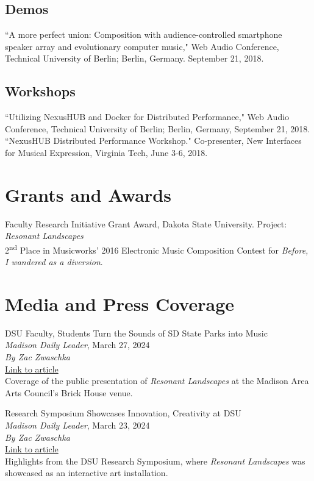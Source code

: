 \documentclass[12pt, a4paper]{article}
\newcommand{\years}[1]{\marginnote{\scriptsize #1}}
\begin{document}
\subsection*{Demos}
\years{2019} ``A more perfect union: Composition with audience-controlled smartphone speaker array and evolutionary computer music," Web Audio Conference, Technical University of Berlin; Berlin, Germany. September 21, 2018.

\subsection*{Workshops}
\years{2018} ``Utilizing NexusHUB and Docker for Distributed Performance," Web Audio Conference, Technical University of Berlin; Berlin, Germany, September 21, 2018. \\
``NexusHUB Distributed Performance Workshop." Co-presenter, New Interfaces for Musical Expression, Virginia Tech, June 3-6, 2018.



\section*{Grants and Awards}
\years{2023--24} Faculty Research Initiative Grant Award, Dakota State University. Project: \textit{Resonant Landscapes} \\
\years{2016} 2\textsuperscript{nd} Place in Musicworks’ 2016 Electronic Music Composition Contest for \textit{Before, I wandered as a diversion}. 

\section*{Media and Press Coverage}

\years{2024} DSU Faculty, Students Turn the Sounds of SD State Parks into Music \\
\textit{Madison Daily Leader}, March 27, 2024 \\
\textit{By Zac Zwaschka} \\
\href{https://www.madisondailyleader.com/news/local/article_c0bdd132-ec50-11ee-8049-a715d4e9b761.html}{Link to article} \\
Coverage of the public presentation of \textit{Resonant Landscapes} at the Madison Area Arts Council's Brick House venue.

\years{2024} Research Symposium Showcases Innovation, Creativity at DSU \\
\textit{Madison Daily Leader}, March 23, 2024 \\
\textit{By Zac Zwaschka} \\
\href{https://www.madisondailyleader.com/news/local/article_455caa5e-e85e-11ee-8628-cf0c5c2b7152.html}{Link to article} \\
Highlights from the DSU Research Symposium, where \textit{Resonant Landscapes} was showcased as an interactive art installation.
\end{document}
